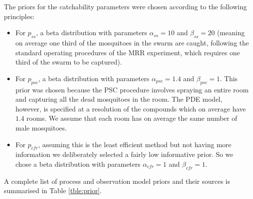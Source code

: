 \documentclass[]{bmcart}
\begin{document}
The priors for the catchability parameters were chosen according to the following principles:
\begin{itemize}
\item For $p_{ss}$, a beta distribution with parameters $\alpha_{ss} = 10$ and $\beta_{ss} = 20$ (meaning on average one third of the mosquitoes in the swarm are caught, following the standard operating procedures of the MRR experiment, which requires one third of the swarm to be captured).
\item For $p_{psc}$, a beta distribution with parameters $\alpha_{psc} = 1.4$ and $\beta_{psc} = 1$. This prior was chosen because the PSC procedure involves spraying an entire room and capturing all the dead mosquitoes in the room. The PDE model, however, is specified at a resolution of the compounds which on average have $1.4$ rooms. We assume that each room has on average the same number of male mosquitoes.
\item For $p_{cfr}$, assuming this is the least efficient method but not having more information we deliberately selected a fairly low informative prior. So we chose a beta distribution with parameters $\alpha_{cfr} = 1$ and $\beta_{cfr} = 1$.
\end{itemize} 
A complete list of process and observation model priors and their sources is summarised in Table \ref{tble:prior}.
\end{document}
